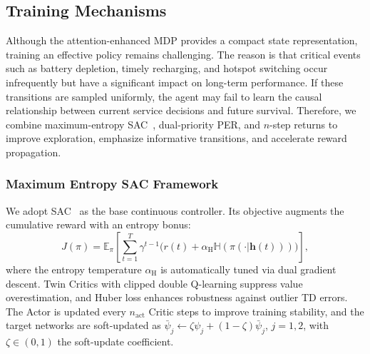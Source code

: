 \documentclass[journal]{IEEEtran}
\begin{document}
\subsection{Training Mechanisms}\label{subsec:training}
Although the attention-enhanced MDP provides a compact state representation,
training an effective policy remains challenging. The reason is that critical
events such as battery depletion, timely recharging, and hotspot switching
occur infrequently but have a significant impact on long-term performance.
If these transitions are sampled uniformly, the agent may fail to learn the
causal relationship between current service decisions and future survival.
Therefore, we combine maximum-entropy SAC~\cite{haarnoja2018soft}, dual-priority PER, and $n$-step
returns to improve exploration, emphasize informative transitions, and
accelerate reward propagation.
\subsubsection{Maximum Entropy SAC Framework}
We adopt SAC~\cite{haarnoja2018soft} as the base continuous controller.
Its objective augments the cumulative reward with an entropy bonus:
\begin{equation}\label{eq:sac_obj}
  J(\pi) = \mathbb{E}_{\pi}\left[
    \sum_{t=1}^{T} \gamma^{t-1}
    \bigl(r(t) + \alpha_{\mathrm{H}}
    \mathbb{H}(\pi(\cdot|\bm{h}(t)))\bigr)
  \right],
\end{equation}
where the entropy temperature $\alpha_{\mathrm{H}}$ is automatically
tuned via dual gradient descent.
Twin Critics with clipped double Q-learning suppress value overestimation,
and Huber loss enhances robustness against outlier TD errors.
The Actor is updated every $n_{\mathrm{act}}$ Critic steps to improve training
stability, and the target networks are soft-updated as
$\bar\psi_j\leftarrow\zeta\psi_j+(1-\zeta)\bar\psi_j$, $j=1,2$,
with $\zeta\in(0,1)$ the soft-update coefficient.
\renewcommand{\algorithmicrequire}{\textbf{Input:}}
\renewcommand{\algorithmicensure}{\textbf{Output:}}
\end{document}
